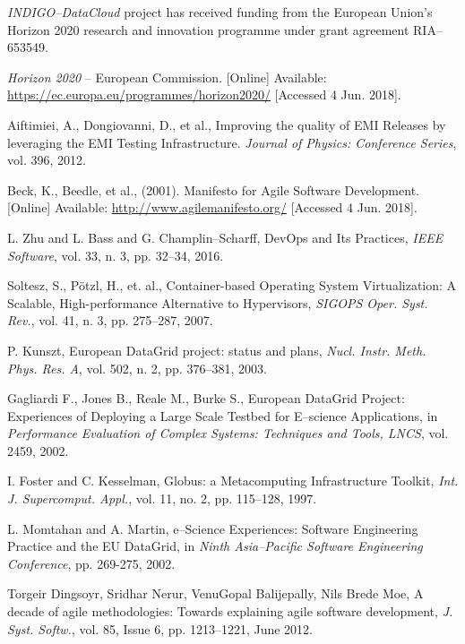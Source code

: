 \documentclass[journal]{IEEEtran}
\begin{document}
{\sl INDIGO--DataCloud} project has received funding from the European Union's Horizon
2020 research and innovation programme under grant agreement RIA--653549.

\begin{thebibliography}{1}

\emph{Horizon 2020} -- European Commission.
[Online] Available: \url{https://ec.europa.eu/programmes/horizon2020/}
[Accessed 4 Jun. 2018].

Aiftimiei, A., Dongiovanni, D., et al.,  
Improving the quality of EMI Releases by leveraging the
EMI Testing Infrastructure.
\emph{Journal of Physics: Conference Series},
vol. 396, 2012.

Beck, K., Beedle, et al., (2001).
Manifesto for Agile Software Development.
[Online] Available: \url{http://www.agilemanifesto.org/}
[Accessed 4 Jun. 2018].

L. Zhu and L. Bass and G. Champlin--Scharff,
DevOps and Its Practices,
\emph{IEEE Software},
vol. 33, n. 3, pp. 32--34, 2016.

Soltesz, S., P\"{o}tzl, H., et. al.,
Container-based Operating System Virtualization: A Scalable, High-performance Alternative to Hypervisors,
\emph{SIGOPS Oper. Syst. Rev.},
vol. 41, n. 3, pp. 275--287, 2007.

P. Kunszt,
European DataGrid project: status and plans,
\emph{Nucl. Instr. Meth. Phys. Res. A},
vol. 502, n. 2, pp. 376--381, 2003.

Gagliardi F., Jones B., Reale M., Burke S.,
European DataGrid Project: Experiences of Deploying a Large Scale Testbed for E--science Applications,
in \emph{Performance Evaluation of Complex Systems: Techniques and Tools, LNCS},
vol. 2459, 2002.

I. Foster and C. Kesselman,
Globus: a Metacomputing Infrastructure Toolkit,
\emph{Int. J. Supercomput. Appl.},
vol. 11, no. 2, pp. 115--128, 1997.

L. Momtahan and A. Martin,
e--Science Experiences: Software Engineering Practice and the EU DataGrid,
in \emph{Ninth Asia--Pacific Software Engineering Conference},
pp. 269-275, 2002.

Torgeir Dingsoyr, Sridhar Nerur, VenuGopal Balijepally, Nils Brede Moe,
A decade of agile methodologies: Towards explaining agile software development,
\emph{J. Syst. Softw.},
vol. 85, Issue 6, pp. 1213--1221, June 2012.


\end{thebibliography}
\end{document}
